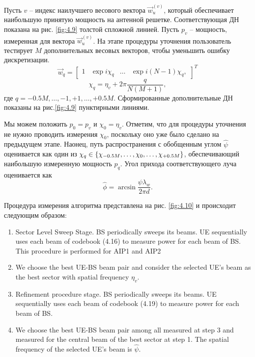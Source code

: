 Пусть $v$ -- индекс наилучшего весового вектора $\vec w_u^{(v)}$, который обеспечивает наибольшую принятую мощность на антенной решетке.
Соответствующая ДН показана на рис. \ref{fig:4.9} толстой спложной линией. Пусть $p_v$ -- мощность, измеренная для вектора $\vec w_u^{(v)}$. На этапе процедуры уточнения
пользователь тестирует $M$ дополнительных весовых векторов, чтобы уменьшить ошибку дискретизации.
\begin{equation}
    \label{eq:4.19}
    \vec w_q =
    \begin{bmatrix}
        1 & \exp {i \chi_q} & \dots & \exp{i(N-1)\chi_q},
    \end{bmatrix}^T
\end{equation}
\begin{equation}
    \chi_q = \eta_v + 2\pi \frac{q}{N(M+1)},
\end{equation}
где $q=-0.5M,\dots,-1,+1,\dots,+0.5M$. Сформированные дополнительные ДН показаны на рис.\ref{fig:4.9} пунктирными линиями.

Мы можем положить $p_0= p_v$ и $\chi_0 = \eta_v$. Отметим, что для процедуры уточнения не нужно проводить измерения $\chi_0$, поскольку оно уже было сделано на предыдущем этапе.
Наонец, путь распространения с обобщенным углом $\hat \psi$ оценивается как один из $\chi_q \in \qty{\chi_{-0.5 M}, \dots, \chi_0, \dots, \chi_{+0.5M}}$,
обеспечивающий наибольшую измеренную мощность $p_q$. Угол прихода соответствующего луча оценивается как
\begin{equation}
    \hat \phi = \arcsin{\frac{\psi \lambda_w}{2\pi d}}.
\end{equation}

Процедура измерения алгоритма представлена на рис. \ref{fig:4.10} и происходит следующим образом:
\begin{enumerate}
    \item Sector Level Sweep Stage. BS periodically sweeps its beams. UE
          sequentially uses each beam of codebook (4.16) to measure power for each
          beam of BS. This procedure is performed for AIP1 and AIP2
    \item We choose the best UE-BS beam pair and consider the selected UE’s
          beam as the best sector with spatial frequency $\eta_v$.
    \item Refinement procedure stage. BS periodically sweeps its beams. UE
          sequentially uses each beam of codebook (4.19) to measure power for each
          beam of BS.
    \item We choose the best UE-BS beam pair among all measured at step 3 and
          measured for the central beam of the best sector at step 1. The spatial
          frequency of the selected UE’s beam is $\hat \psi$.
\end{enumerate}

